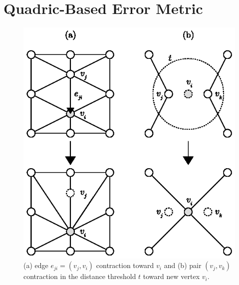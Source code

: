 \section{Quadric-Based Error Metric} \label{sec:quadric-based_error_metric}
\iffalse %
\begin{figure}[ht]
    \centering
    \begin{minipage}{0.49\textwidth}
        \centering
        \includegraphics[width=\textwidth]{figures/contraction_types.eps}
        \caption{(a) edge \(e_{ji} = (v_j, v_i)\) contraction toward \(v_i\)
                 and (b) pair \((v_j, v_k)\) contraction in the distance threshold \(t\) toward new vertex \(v_i\).}
        \label{fig:contractions}
    \end{minipage} \hfill
    \begin{minipage}{0.485\textwidth}
        \centering

\end{minipage}
\end{figure}

